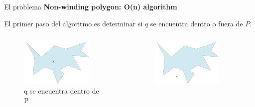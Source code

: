 \documentclass[aspectratio=169,xcolor=dvipsnames, t]{beamer}
\begin{document}
\begin{frame}{El problema}
\textbf{Non-winding polygon: O(n) algorithm}\\
    \vspace{0.5cm}
\end{frame}


\begin{frame}
    \vspace{0.5cm}
    El primer paso del algoritmo es determinar si $q$ se encuentra dentro o fuera de $P$.\\
    \begin{columns}
      \begin{column}{0.45\textwidth}
        \begin{figure}
          \centering
          \includegraphics[width=0.8\textwidth]{imagenes/Caso1.1.png}
          \caption{q se encuentra dentro de P}
        \end{figure}
      \end{column}
      \begin{column}{0.45\textwidth}  %
        \begin{figure}
          \centering
          \includegraphics[width=0.8\textwidth]{imagenes/Caso1.2.png}

\end{figure}
\end{column}
\end{columns}
\end{frame}
\end{document}

